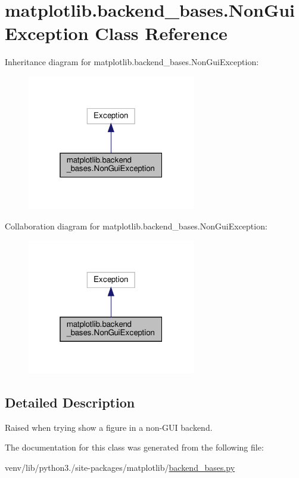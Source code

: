 \hypertarget{classmatplotlib_1_1backend__bases_1_1NonGuiException}{}\section{matplotlib.\+backend\+\_\+bases.\+Non\+Gui\+Exception Class Reference}
\label{classmatplotlib_1_1backend__bases_1_1NonGuiException}


Inheritance diagram for matplotlib.\+backend\+\_\+bases.\+Non\+Gui\+Exception\+:
\nopagebreak
\begin{figure}[H]
\begin{center}
\leavevmode
\includegraphics[width=208pt]{classmatplotlib_1_1backend__bases_1_1NonGuiException__inherit__graph}
\end{center}
\end{figure}


Collaboration diagram for matplotlib.\+backend\+\_\+bases.\+Non\+Gui\+Exception\+:
\nopagebreak
\begin{figure}[H]
\begin{center}
\leavevmode
\includegraphics[width=208pt]{classmatplotlib_1_1backend__bases_1_1NonGuiException__coll__graph}
\end{center}
\end{figure}


\subsection{Detailed Description}
\begin{DoxyVerb}Raised when trying show a figure in a non-GUI backend.\end{DoxyVerb}
 

The documentation for this class was generated from the following file\+:\begin{DoxyCompactItemize}
\item 
venv/lib/python3./site-\/packages/matplotlib/\hyperlink{backend__bases_8py}{backend\+\_\+bases.\+py}\end{DoxyCompactItemize}
